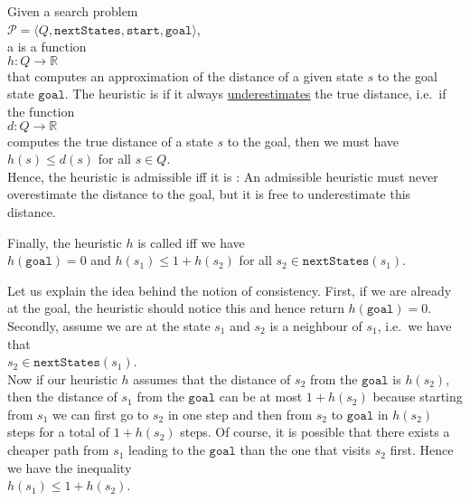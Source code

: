\begin{Definition}[Heuristic]
Given a search problem
\\[0.2cm]
\hspace*{1.3cm}
$\mathcal{P} = \langle Q, \mathtt{nextStates}, \mathtt{start}, \mathtt{goal} \rangle$,
\\[0.2cm]
a  is a function
\\[0.2cm]
\hspace*{1.3cm}
$h: Q \rightarrow \mathbb{R}$
\\[0.2cm]
that computes an approximation of the distance of a given state $s$ to the goal state $\mathtt{goal}$.
The heuristic is  if it always \underline{underestimates} the true distance, i.e.~if the function
\\[0.2cm]
\hspace*{1.3cm}
$d:Q \rightarrow \mathbb{R}$
\\[0.2cm]
computes the true distance of a state $s$ to the goal, then we must have
\\[0.2cm]
\hspace*{1.3cm}
$h(s) \leq d(s)$ \quad for all $s \in Q$.
\\[0.2cm]
Hence, the heuristic is admissible iff it is :  An admissible heuristic must never overestimate the
distance to the goal, but it is free to underestimate this distance.

Finally, the  heuristic $h$ is called  iff we have
\\[0.2cm]
\hspace*{1.3cm}
$h(\mathtt{goal}) = 0$ \quad and \quad $h(s_1) \leq 1 + h(s_2)$ \quad for all $s_2 \in \mathtt{nextStates}(s_1)$.  \eod
\end{Definition}

Let us explain the idea behind the notion of consistency.  First, if we are already at the goal, the heuristic
should notice this and hence return $h(\mathtt{goal}) = 0$.  Secondly, assume we are at the state $s_1$ and $s_2$ is a
neighbour of $s_1$, i.e.~we have that
\\[0.2cm]
\hspace*{1.3cm}
$s_2 \in \mathtt{nextStates}(s_1)$.
\\[0.2cm]
Now if our heuristic $h$ assumes that the distance of $s_2$ from the $\mathtt{goal}$ is $h(s_2)$, then the distance of
$s_1$ from the $\mathtt{goal}$ can be at most $1 + h(s_2)$ because starting from $s_1$ we can first go to $s_2$
in one step and then from $s_2$ to $\mathtt{goal}$ in $h(s_2)$ steps for a total of $1 + h(s_2)$ steps.  Of
course, it is possible that there exists a cheaper path from $s_1$ leading to the $\mathtt{goal}$ than the one
that visits $s_2$ first.  Hence we have the inequality
\\[0.2cm]
\hspace*{1.3cm}
$h(s_1) \leq 1 + h(s_2)$.

